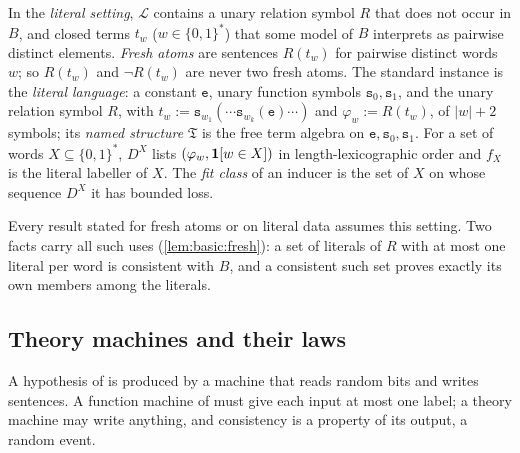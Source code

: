 \begin{definition}\label{def:setting:fresh}
In the \emph{literal setting}, $\mathcal L$ contains a unary relation symbol $R$ that does not occur in $B$, and closed terms $t_w$ ($w\in\{0,1\}^*$) that some model of $B$ interprets as pairwise distinct elements. \emph{Fresh atoms} are sentences $R(t_w)$ for pairwise distinct words $w$; so $R(t_w)$ and $\neg R(t_w)$ are never two fresh atoms. The standard instance is the \emph{literal language}: a constant $\mathtt e$, unary function symbols $\mathtt s_0,\mathtt s_1$, and the unary relation symbol $R$, with $t_w:=\mathtt s_{w_1}(\cdots\mathtt s_{w_k}(\mathtt e)\cdots)$ and $\varphi_w:=R(t_w)$, of $\lvert w\rvert+2$ symbols; its \emph{named structure} $\mathfrak T$ is the free term algebra on $\mathtt e,\mathtt s_0,\mathtt s_1$. For a set of words $X\subseteq\{0,1\}^*$, $D^X$ lists $(\varphi_w,\mathbf{1}[w\in X])$ in length-lexicographic order and $f_X$ is the literal labeller of $X$. The \emph{fit class} of an inducer is the set of $X$ on whose sequence $D^X$ it has bounded loss.
\end{definition}

Every result stated for fresh atoms or on literal data assumes this setting. Two facts carry all such uses (\cref{lem:basic:fresh}): a set of literals of $R$ with at most one literal per word is consistent with $B$, and a consistent such set proves exactly its own members among the literals.

\subsection{Theory machines and their laws}\label{sec:setting:machines}

A hypothesis of \SAI is produced by a machine that reads random bits and writes sentences. A function machine of \SOI must give each input at most one label; a theory machine may write anything, and consistency is a property of its output, a random event.

